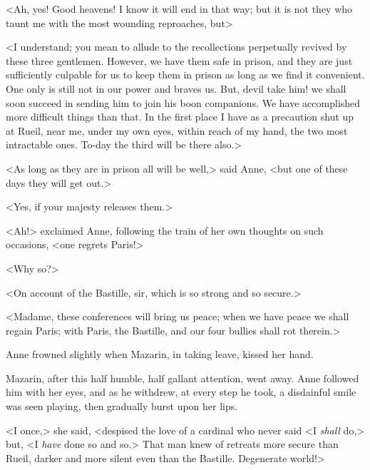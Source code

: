 <Ah, yes! Good heavens! I know it will end in that way; but it is not they who taunt me with the most wounding reproaches, but\longdash>

<I understand; you mean to allude to the recollections perpetually revived by these three gentlemen. However, we have them safe in prison, and they are just sufficiently culpable for us to keep them in prison as long as we find it convenient. One only is still not in our power and braves us. But, devil take him! we shall soon succeed in sending him to join his boon companions. We have accomplished more difficult things than that. In the first place I have as a precaution shut up at Rueil, near me, under my own eyes, within reach of my hand, the two most intractable ones. To-day the third will be there also.>

<As long as they are in prison all will be well,> said Anne, <but one of these days they will get out.>

<Yes, if your majesty releases them.>

<Ah!> exclaimed Anne, following the train of her own thoughts on such occasions, <one regrets Paris!>

<Why so?>

<On account of the Bastille, sir, which is so strong and so secure.>

<Madame, these conferences will bring us peace; when we have peace we shall regain Paris; with Paris, the Bastille, and our four bullies shall rot therein.>

Anne frowned slightly when Mazarin, in taking leave, kissed her hand.

Mazarin, after this half humble, half gallant attention, went away. Anne followed him with her eyes, and as he withdrew, at every step he took, a disdainful smile was seen playing, then gradually burst upon her lips.

<I once,> she said, <despised the love of a cardinal who never said <I \textit{shall} do,> but, <I \textit{have} done so and so.> That man knew of retreats more secure than Rueil, darker and more silent even than the Bastille. Degenerate world!> 